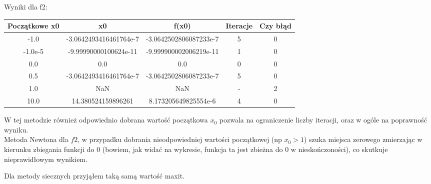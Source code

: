 \documentclass[15pt, a4paper]{article}
\begin{document}
\noindent Wyniki dla f2:
\begin{table}[ht]
\begin{adjustbox}{max width=\textwidth}
\begin{tabular}{|c|c|c|c|c|}
    \hline
    \textbf{Początkowe x0} & \textbf{x0} & \textbf{f(x0)} & \textbf{Iteracje} & \textbf{Czy błąd} \\
    \hline
    -1.0 & -3.0642493416461764e-7 & -3.0642502806087233e-7 & 5 & 0 \\
    \hline
    -1.0e-5 & -9.99990000100624e-11 & -9.999900002006219e-11 & 1 & 0 \\
    \hline
    0.0 & 0.0 & 0.0 & 0 & 0 \\
    \hline
    0.5 & -3.0642493416461764e-7 & -3.0642502806087233e-7 & 5 & 0 \\
    \hline
    1.0 & NaN & NaN & - & 2 \\
    \hline
    10.0 & 14.380524159896261 & 8.173205649825554e-6 & 4 & 0 \\
    \hline
\end{tabular}
\end{adjustbox}
\end{table}

\noindent W tej metodzie również odpowiednio dobrana wartość początkowa \( x_0 \) pozwala na ograniczenie liczby iteracji, oraz w ogóle na poprawność wyniku.\\ 


\noindent Metoda Newtona dla \(f2\), w przypadku dobrania nieodpowiedniej wartości początkowej (np \(x_0 > 1\)) szuka miejsca zerowego zmierzając w kierunku zbiegania funkcji do 0 (bowiem, jak widać na wykresie, funkcja ta jest zbieżna do 0 w nieskończoności), co skutkuje nieprawidłowym wynikiem. 


\pagebreak

\noindent Dla metody siecznych przyjąłem taką samą wartość maxit.
\end{document}
